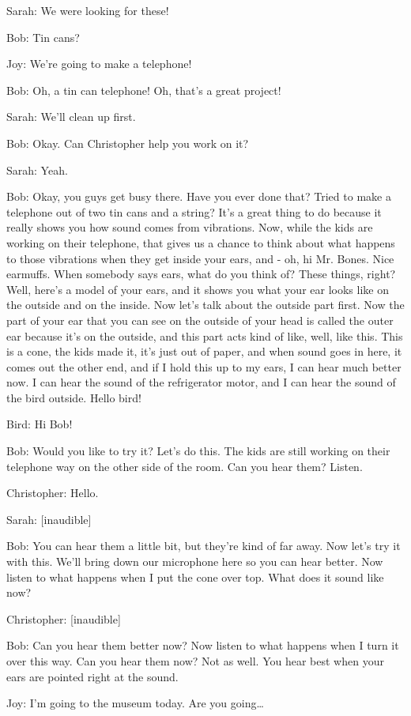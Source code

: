 Sarah: We were looking for these!

Bob: Tin cans?

Joy: We're going to make a telephone!

Bob: Oh, a tin can telephone! Oh, that's a great project!

Sarah: We'll clean up first.

Bob: Okay. Can Christopher help you work on it?

Sarah: Yeah.

Bob: Okay, you guys get busy there. Have you ever done that? Tried to make a telephone out of two tin cans and a string? It's a great thing to do because it really shows you how sound comes from vibrations. Now, while the kids are working on their telephone, that gives us a chance to think about what happens to those vibrations when they get inside your ears, and - oh, hi Mr. Bones. Nice earmuffs. When somebody says ears, what do you think of? These things, right? Well, here's a model of your ears, and it shows you what your ear looks like on the outside and on the inside. Now let's talk about the outside part first. Now the part of your ear that you can see on the outside of your head is called the outer ear because it's on the outside, and this part acts kind of like, well, like this. This is a cone, the kids made it, it's just out of paper, and when sound goes in here, it comes out the other end, and if I hold this up to my ears, I can hear much better now. I can hear the sound of the refrigerator motor, and I can hear the sound of the bird outside. Hello bird!

Bird: Hi Bob!

Bob: Would you like to try it? Let's do this. The kids are still working on their telephone way on the other side of the room. Can you hear them? Listen.

Christopher: Hello.

Sarah: [inaudible]

Bob: You can hear them a little bit, but they're kind of far away. Now let's try it with this. We'll bring down our microphone here so you can hear better. Now listen to what happens when I put the cone over top. What does it sound like now?

Christopher: [inaudible]

Bob: Can you hear them better now? Now listen to what happens when I turn it over this way. Can you hear them now? Not as well. You hear best when your ears are pointed right at the sound.

Joy: I'm going to the museum today. Are you going\dots

